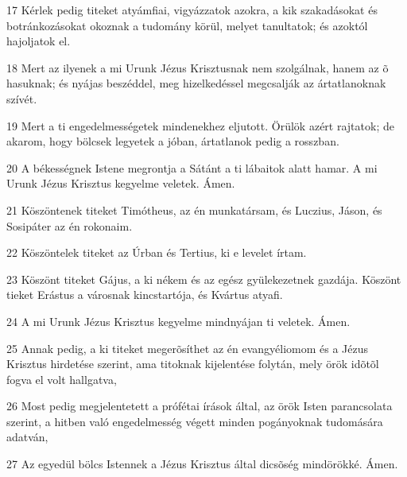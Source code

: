 \par 17 Kérlek pedig titeket atyámfiai, vigyázzatok azokra, a kik szakadásokat és botránkozásokat okoznak a tudomány körül, melyet tanultatok; és azoktól hajoljatok el.
\par 18 Mert az ilyenek a mi Urunk Jézus Krisztusnak nem szolgálnak, hanem az õ hasuknak; és nyájas beszéddel, meg hizelkedéssel megcsalják az ártatlanoknak szívét.
\par 19 Mert a ti engedelmességetek mindenekhez eljutott. Örülök azért rajtatok; de akarom, hogy bölcsek legyetek a jóban, ártatlanok pedig a rosszban.
\par 20 A békességnek Istene megrontja a Sátánt a ti lábaitok alatt hamar. A mi Urunk Jézus Krisztus kegyelme veletek. Ámen.
\par 21 Köszöntenek titeket Timótheus, az én munkatársam, és Luczius, Jáson, és Sosipáter az én rokonaim.
\par 22 Köszöntelek titeket az Úrban és Tertius, ki e levelet írtam.
\par 23 Köszönt titeket Gájus, a ki nékem és az egész gyülekezetnek gazdája. Köszönt tieket Erástus a városnak kincstartója, és Kvártus atyafi.
\par 24 A mi Urunk Jézus Krisztus kegyelme mindnyájan ti veletek. Ámen.
\par 25 Annak pedig, a ki titeket megerõsíthet az én evangyéliomom és a Jézus Krisztus hirdetése szerint, ama titoknak kijelentése folytán, mely örök idõtõl fogva el volt  hallgatva,
\par 26 Most pedig megjelentetett a prófétai írások által, az örök Isten parancsolata szerint, a hitben való engedelmesség végett minden pogányoknak tudomására adatván,
\par 27 Az egyedül bölcs Istennek a Jézus Krisztus által dicsõség mindörökké. Ámen.


